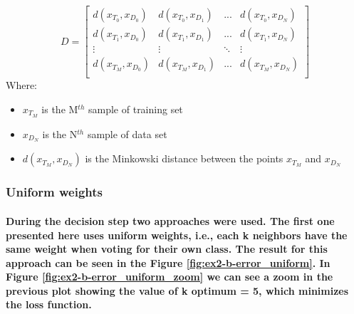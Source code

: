 \documentclass[a4paper]{article}    %
\begin{document}
\begin{center}
    \begin{minipage}{.7\textwidth}
        \[ D = \begin{bmatrix}
          d(x_{T_0},x_{D_0}) & d(x_{T_0},x_{D_1}) &   ...  & d(x_{T_0},x_{D_N}) \\ 
          d(x_{T_1},x_{D_0}) & d(x_{T_1},x_{D_1}) &   ...  & d(x_{T_1},x_{D_N}) \\ 
                 \vdots      &       \vdots       & \ddots &        \vdots      \\
          d(x_{T_M},x_{D_0}) & d(x_{T_M},x_{D_1}) &   ...  & d(x_{T_M},x_{D_N}) \\ 
        \end{bmatrix} \]
        Where:
        \begin{itemize}
            \item $x_{T_M}$ is the M$^{th}$ sample of training set
            \item $x_{D_N}$ is the N$^{th}$ sample of data set
            \item $d(x_{T_M},x_{D_N})$ is the Minkowski distance between the points $x_{T_M}$ and $x_{D_N}$
        \end{itemize}
    \end{minipage}
\end{center}


\subsubsection{Uniform weights}

\paragraph{During the decision step two approaches were used. The first one presented here uses uniform weights, i.e., each k neighbors have the same weight when voting for their own class. The result for this approach can be seen in the Figure \ref{fig:ex2-b-error_uniform}. In Figure \ref{fig:ex2-b-error_uniform_zoom} we can see a zoom in the previous plot showing the value of k optimum = 5, which minimizes the loss function.}
\end{document}
